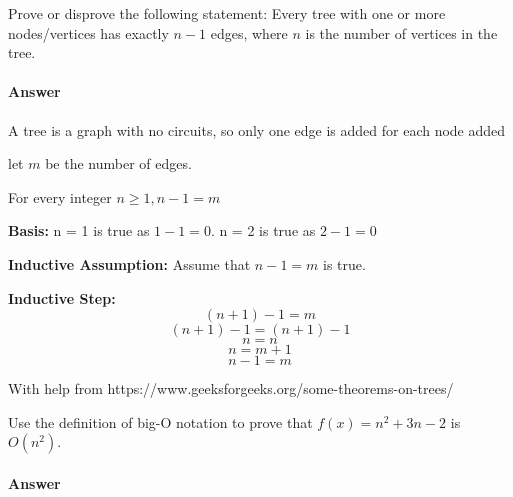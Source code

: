 \documentclass{article}
\begin{document}
\collab{\todo{}}

Prove or disprove the following statement: Every tree with one or more
nodes/vertices has exactly $n-1$ edges, where $n$ is the number of vertices in
the tree.

\paragraph{Answer}

A tree is a graph with no circuits, so only one edge is added for each node added

let $m$ be the number of edges.

For every integer $n \geq 1, n - 1 = m$

{\bf Basis:} n = 1 is true as $1 - 1 = 0$. n = 2 is true as $2-1=0$

{\bf Inductive Assumption:} Assume that $n - 1 = m$ is true.

    {\bf Inductive Step:} $$(n+1) -1 = m $$
$$(n+1) -1 = (n +1) - 1$$
$$n=n$$
$$n=m +1$$
$$n-1=m$$

With help from https://www.geeksforgeeks.org/some-theorems-on-trees/


\collab{\todo{}}

Use the definition of big-O notation to prove that $f(x)=n^2 + 3n -2$ is
$O(n^2)$.

\paragraph{Answer}

\todo{}
\end{document}
